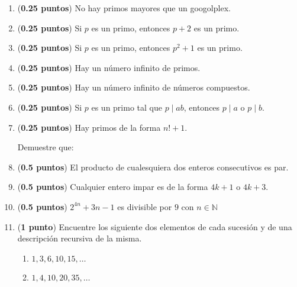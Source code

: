 \documentclass[fontsize=12pt]{scrartcl}
\begin{document}
\begin{enumerate}
		\item ({\bf 0.25 puntos})
		No hay primos mayores que un googolplex.
		
		\item ({\bf 0.25 puntos})
		Si $p$ es un primo, entonces $ p + 2 $ es un primo.
		
		\item ({\bf 0.25 puntos})
		Si $ p $ es un primo, entonces $ p^{2} + 1 $ es un primo.
		
		\item ({\bf 0.25 puntos})
		Hay un n\'umero infinito de primos.
		
		\item ({\bf 0.25 puntos})
		Hay un n\'umero infinito de n\'umeros compuestos.
		
		\item ({\bf 0.25 puntos})
		Si $ p $ es un primo tal que $ p \mid ab $, entonces $ p \mid  a $ 
		o $ p \mid b $.
		
		\item ({\bf 0.25 puntos})
		Hay primos de la forma $n! + 1 $.
		
	
	Demuestre que:
				
		\item ({\bf 0.5 puntos})
		El producto de cualesquiera dos enteros consecutivos es par.
		
		\item ({\bf 0.5 puntos})
		Cualquier entero impar es de la forma $4k + 1$ o $4k + 3$.
		
		\item ({\bf 0.5 puntos}) 
		$2^{4n} + 3n - 1$ es divisible por $9$ con $n \in \mathbb{N}$ 
		
		\item ({\bf 1 punto}) Encuentre los siguiente dos elementos de cada 
		sucesi\'on y de una descripci\'on recursiva de la misma.
			\begin{enumerate}
				\item $1, 3, 6, 10, 15, \dots$
				\item $1, 4, 10, 20, 35, \dots$
			\end{enumerate}
		

\end{enumerate}
\end{document}

